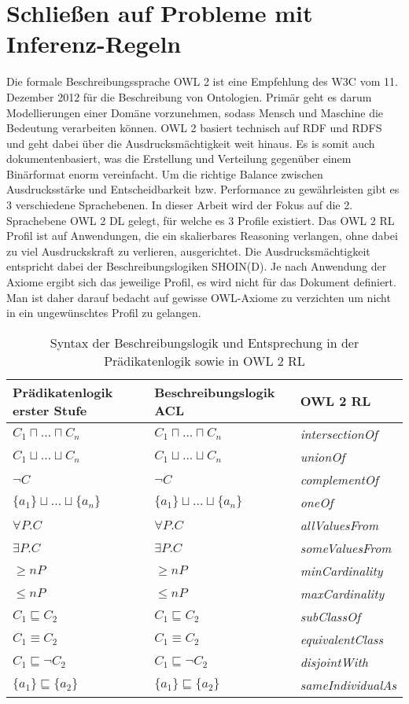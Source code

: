 \documentclass[runningheads,a4paper]{llncs}
\begin{document}
\section{Schließen auf Probleme mit Inferenz-Regeln}
Die formale Beschreibungssprache OWL 2 ist eine Empfehlung des W3C vom 11. Dezember 2012 für die Beschreibung von Ontologien. 
Primär geht es darum Modellierungen einer Domäne vorzunehmen, sodass Mensch und Maschine die Bedeutung verarbeiten können. 
OWL 2 basiert technisch auf RDF und RDFS und geht dabei über die Ausdrucksmächtigkeit weit hinaus. 
Es is somit auch dokumentenbasiert, was die Erstellung und Verteilung gegenüber einem Binärformat enorm vereinfacht. 
Um die richtige Balance zwischen Ausdrucksstärke und Entscheidbarkeit bzw. Performance zu gewährleisten gibt es 3 verschiedene Sprachebenen. 
In dieser Arbeit wird der Fokus auf die 2. Sprachebene OWL 2 DL gelegt, für welche es 3 Profile existiert. 
Das OWL 2 RL Profil ist auf Anwendungen, die ein skalierbares Reasoning verlangen, ohne dabei zu viel Ausdruckskraft zu verlieren, ausgerichtet. 
Die Ausdrucksmächtigkeit entspricht dabei der Beschreibungslogiken SHOIN(D). 
Je nach Anwendung der Axiome ergibt sich das jeweilige Profil, es wird nicht für das Dokument definiert. 
Man ist daher darauf bedacht auf gewisse OWL-Axiome zu verzichten um nicht in ein ungewünschtes Profil zu gelangen.
\begin{table}[h]
\begin{tabular}{|l|l|l|}
\hline
Prädikatenlogik erster Stufe & Beschreibungslogik ACL & OWL 2 RL \\ \hline
$ C_1 \sqcap ... \sqcap C_n $ & $ C_1 \sqcap ... \sqcap C_n $ & \textit{intersectionOf} \\ \hline
$ C_1 \sqcup ... \sqcup C_n $ & $ C_1 \sqcup ... \sqcup C_n $ & \textit{unionOf} \\ \hline
$ \neg C $ & $ \neg C $ & \textit{complementOf} \\ \hline
$ \{a_1\} \sqcup ... \sqcup \{a_n\} $ & $ \{a_1\} \sqcup ... \sqcup \{a_n\} $ & \textit{oneOf} \\ \hline
$ \forall P.C $ & $ \forall P.C $ & \textit{allValuesFrom} \\ \hline
$ \exists P.C $ & $ \exists P.C $ & \textit{someValuesFrom} \\ \hline
$ \geq n P $ & $ \geq n P $ & \textit{minCardinality} \\ \hline
$ \leq n P $ & $ \leq n P $ & \textit{maxCardinality} \\ \hline
$ C_1 \sqsubseteq C_2 $ & $ C_1 \sqsubseteq C_2 $ & \textit{subClassOf} \\ \hline
$ C_1 \equiv C_2 $ & $ C_1 \equiv C_2 $ & \textit{equivalentClass} \\ \hline
$ C_1 \sqsubseteq \neg C_2 $ & $ C_1 \sqsubseteq \neg C_2 $ & \textit{disjointWith} \\ \hline
$ \{a_1\} \sqsubseteq \{a_2\} $ & $ \{a_1\} \sqsubseteq \{a_2\} $ & \textit{sameIndividualAs} \\ \hline
\end{tabular}
\label{table:description_logic}
\caption{Syntax der Beschreibungslogik und Entsprechung in der Prädikatenlogik sowie in OWL 2 RL}
\end{table}
\end{document}
